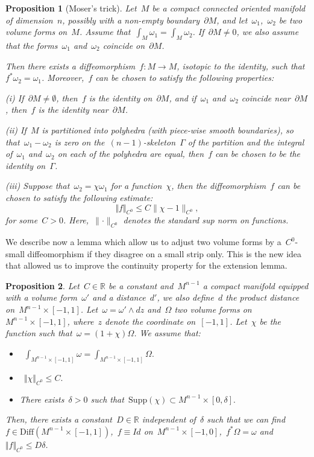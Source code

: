\documentclass[10pt]{amsart}
\newtheorem{prop}{Proposition}[section]
\begin{document}
\begin{prop}[Moser's trick]\label{prop: Moser's trick}
Let~$M$ be a compact connected oriented manifold of dimension~$n$, possibly with a non-empty boundary~$\partial M$, and let~$\omega_1$,~$\omega_2$ be two volume forms on~$M$. Assume that~$\int_M \omega_1=\int_M\omega_2$. If~$\partial M\neq 0$, we also assume that the forms~$\omega_1$ and~$\omega_2$ coincide on~$\partial M$.

Then there exists a diffeomorphism~$f: M \rightarrow M$, isotopic to the identity, such that~$f^* \omega_2=\omega_1$. Moreover,~$f$ can be chosen to satisfy the following properties: 

\medskip


(i) If~$\partial M \neq \emptyset$, then~$f$ is the identity on~$\partial M$, and if~$\omega_1$ and~$\omega_2$ coincide near~$\partial M$, then~$f$ is the identity near~$\partial M$.

\medskip
 
(ii) If~$M$ is partitioned into polyhedra (with piece-wise smooth boundaries), so that~$\omega_1-\omega_2$ is zero on the~$(n-1)$-skeleton~$\Gamma$ of the partition and the integral of~$\omega_1$ and~$\omega_2$ on each of the polyhedra are equal, then~$f$ can be chosen to be the identity on~$\Gamma$.
 
\medskip
 
(iii) Suppose that~$\omega_2=\chi\omega_1$ for a function~$\chi$, then the diffeomorphism~$f$ can be chosen to satisfy the following estimate: 
$$\Vert f \Vert_{C^0}\leq C \lVert\chi-1 \rVert_{C^0},$$
for some~$C>0$. Here,~$\lVert \cdot \rVert_{C^0}$ denotes the standard sup norm on functions.
\end{prop}

We describe now a lemma which allow us to adjust two volume forms by a~$C^0$-small diffeomorphism if they disagree on a small strip only. This is the new idea that allowed us to improve the continuity property for the extension lemma.

\begin{prop}\label{prop: adjusting volume forms}
Let~$C\in \mathbb{R}$ be a constant and~$M^{n-1}$ a compact manifold equipped with a volume form~$\omega'$ and a distance~$d'$, we also define~$d$ the product distance on~$M^{n-1}\times [-1,1]$. Let~$\omega=\omega' \wedge dz$ and~$\Omega$ two volume forms on~$M^{n-1}\times [-1,1]$, where~$z$ denote the coordinate on~$[-1,1]$. Let~$\chi$ be the function such that~$\omega=(1+\chi)\Omega$. We assume that: 

\begin{itemize}
    \item~$\int_{M^{n-1}\times [-1,1]}\omega =\int_{M^{n-1}\times [-1,1]}\Omega.$
    \item~$\Vert \chi \Vert_{C^0}\leq C.$
    \item There exists~$\delta>0$ such that~$\text{Supp}(\chi)\subset M^{n-1}\times [0,\delta].$
\end{itemize}
Then, there exists a constant~$D\in \mathbb{R}$ independent of~$\delta$ such that we can find~$f\in \text{Diff}(M^{n-1}\times[-1,1])$,~$f\equiv Id$ on~$M^{n-1}\times [-1,0]$,~$f^*\Omega=\omega$ and~$\Vert f \Vert_{C^0}\leq D\delta$.
\end{prop}
\end{document}
